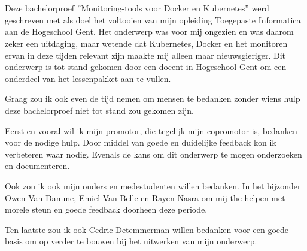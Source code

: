 
\chapter*{}
\label{ch:voorwoord}

Deze bachelorproef ''Monitoring-tools voor Docker en Kubernetes'' werd geschreven met als doel het voltooien van mijn opleiding Toegepaste Informatica aan de Hogeschool Gent. Het onderwerp was voor mij ongezien en was daarom zeker een uitdaging, maar wetende dat Kubernetes, Docker en het monitoren ervan in deze tijden relevant zijn maakte mij alleen maar nieuwsgieriger. Dit onderwerp is tot stand gekomen door een docent in Hogeschool Gent om een onderdeel van het lessenpakket aan te vullen.

Graag zou ik ook even de tijd nemen om mensen te bedanken zonder wiens hulp deze bachelorproef niet tot stand zou gekomen zijn.

Eerst en vooral wil ik mijn promotor, die tegelijk mijn copromotor is, bedanken voor de nodige hulp. Door middel van goede en duidelijke feedback kon ik verbeteren waar nodig. Evenals de kans om dit onderwerp te mogen onderzoeken en documenteren.

Ook zou ik ook mijn ouders en medestudenten willen bedanken. In het bijzonder
Owen Van Damme, Emiel Van Belle en Rayen Nasra om mij the helpen met
morele steun en goede feedback doorheen deze periode.

Ten laatste zou ik ook Cedric Detemmerman willen bedanken voor een goede basis om op verder te bouwen bij het uitwerken van mijn onderwerp.


